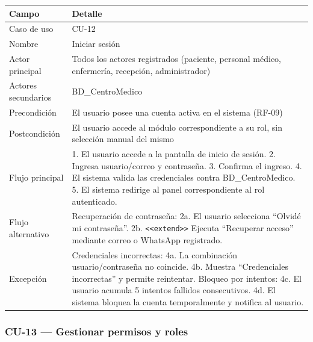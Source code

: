 \documentclass[11pt,a4paper]{article}
\begin{document}
	\begin{longtable}{p{} p{} }
		
		
		\toprule
		\textbf{Campo} &
		\textbf{Detalle}  \\
		\midrule
		\endhead
		
		Caso de uso & CU-12 \\
		Nombre & Iniciar sesión \\
		Actor principal & Todos los actores registrados (paciente, personal médico, enfermería, recepción, administrador) \\
		Actores secundarios & BD\_CentroMedico \\
		Precondición & El usuario posee una cuenta activa en el sistema (RF-09) \\
		Postcondición & El usuario accede al módulo correspondiente a su rol, sin selección manual del mismo \\
		Flujo principal & 1. El usuario accede a la pantalla de inicio de sesión. 2. Ingresa usuario/correo y contraseña. 3. Confirma el ingreso. 4. El sistema valida las credenciales contra BD\_CentroMedico. 5. El sistema redirige al panel correspondiente al rol autenticado. \\
		Flujo alternativo & Recuperación de contraseña: 2a. El usuario selecciona ``Olvidé mi contraseña''. 2b. \texttt{<<extend>>} Ejecuta ``Recuperar acceso'' mediante correo o WhatsApp registrado. \\
		Excepción & Credenciales incorrectas: 4a. La combinación usuario/contraseña no coincide. 4b. Muestra ``Credenciales incorrectas'' y permite reintentar. Bloqueo por intentos: 4c. El usuario acumula 5 intentos fallidos consecutivos. 4d. El sistema bloquea la cuenta temporalmente y notifica al usuario. \\
		\bottomrule
	\end{longtable}
	
	\subsubsection{CU-13 --- Gestionar permisos y roles}
	
\end{document}
